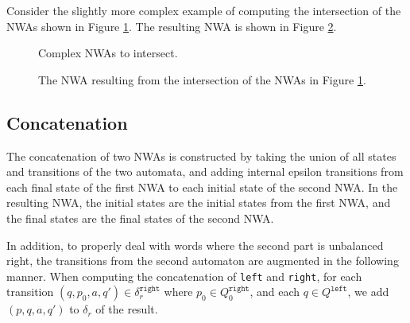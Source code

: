 Consider the slightly more complex example of computing the intersection of
the NWAs shown in Figure \ref{Fi:Intersect3}.  The resulting NWA is shown in
Figure \ref{Fi:Intersect4}.

\begin{figure}[p]
  \centering
  \caption{Complex NWAs to intersect.}
  \label{Fi:Intersect3}
\end{figure}

\begin{figure}[p]
  \centering
  \caption{The NWA resulting from the intersection of the NWAs in Figure \ref{Fi:Intersect3}.}
  \label{Fi:Intersect4}
\end{figure}



\subsection{Concatenation}
\label{Se:Concatenation}

The concatenation of two NWAs is constructed by taking the union of all
states and transitions of the two automata, and adding
internal epsilon transitions from each final state of the first NWA to each
initial state of the second NWA.  In the resulting NWA, the initial states
are the initial states from the first NWA, and the final states are the final
states of the second NWA.

In addition, to properly deal with words where the second part is unbalanced
right, the transitions from the second automaton are augmented in the
following manner. When computing the concatenation of \texttt{left} and
\texttt{right}, for each transition $(q, p_0, a, q')
\in\delta_r^{\texttt{right}}$ where $p_0 \in Q_0^\texttt{right}$, and each $q
\in Q^\texttt{left}$, we add $(p, q, a, q')$ to $\delta_r$ of the result.




